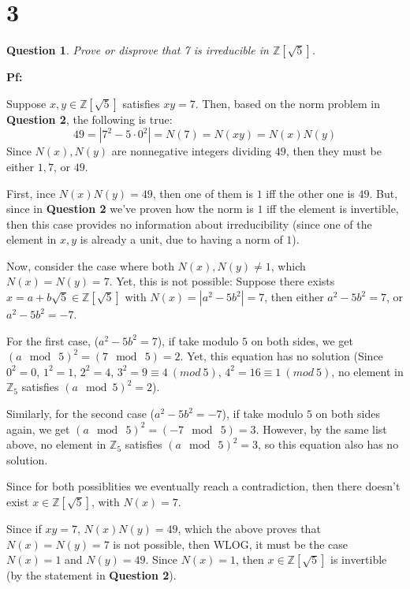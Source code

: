 \documentclass{article}
\newtheorem{question}{Question}
\begin{document}
\break

\section*{3}
\begin{myBox}[]{}
    \begin{question}
        Prove or disprove that 7 is irreducible in $\mathbb{Z}[\sqrt{5}]$.
    \end{question}
\end{myBox}

\textbf{Pf:}

Suppose $x,y\in\mathbb{Z}[\sqrt{5}]$ satisfies $xy=7$. Then, based on the norm problem in \textbf{Question 2},
the following is true:
$$49 = |7^2-5\cdot 0^2| = N(7) = N(xy) = N(x)N(y)$$
Since $N(x),N(y)$ are nonnegative integers dividing $49$, then they must be either $1,7$, or $49$.

\hfil

First, ince $N(x)N(y)=49$, then one of them is $1$ iff the other one is $49$. But, since in \textbf{Question 2} we've proven how the norm is $1$ iff the element is invertible,
then this case provides no information about irreducibility (since one of the element in $x,y$ is already a unit, due to having a norm of $1$).

\hfil

Now, consider the case where both $N(x),N(y)\neq 1$, which $N(x)=N(y)=7$. Yet, this is not possible:
Suppose there exists $x=a+b\sqrt{5}\in\mathbb{Z}[\sqrt{5}]$ with $N(x)=|a^2-5b^2|=7$, then either $a^2-5b^2=7$, or $a^2-5b^2=-7$.

For the first case, ($a^2-5b^2=7$), if take modulo $5$ on both sides, we get $(a\mod\ 5)^2=(7\mod\ 5)=2$. Yet, this equation has no solution
(Since $0^2=0$, $1^2=1$, $2^2=4$, $3^2=9\equiv 4\ (mod\ 5)$, $4^2=16\equiv 1\ (mod\ 5)$, no element in $\mathbb{Z}_5$ satisfies $(a\mod 5)^2=2$).

Similarly, for the second case ($a^2-5b^2=-7$), if take modulo $5$ on both sides again, we get $(a\mod\ 5)^2=(-7\mod\ 5)=3$. However, by the same list above,
no element in $\mathbb{Z}_5$ satisfies $(a\mod\ 5)^2=3$, so this equation also has no solution.

Since for both possiblities we eventually reach a contradiction, then there doesn't exist $x\in\mathbb{Z}[\sqrt{5}]$, with $N(x)=7$.

\hfil

Since if $xy=7$, $N(x)N(y)=49$, which the above proves that $N(x)=N(y)=7$ is not possible, then WLOG, it must be the case $N(x)=1$ and $N(y)=49$.
Since $N(x)=1$, then $x\in\mathbb{Z}[\sqrt{5}]$ is invertible (by the statement in \textbf{Question 2}).
\end{document}
